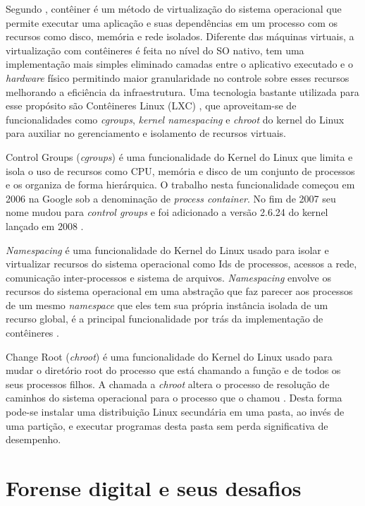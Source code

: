 Segundo \cite{AmazonContainer}, contêiner é um método de virtualização do sistema operacional que permite executar uma aplicação e suas dependências em um processo com os recursos como disco, memória e rede isolados.
%
Diferente das máquinas virtuais, a virtualização com contêineres é feita no nível do SO nativo, tem uma implementação mais simples eliminado camadas entre o aplicativo executado e o \textit{hardware} físico permitindo maior granularidade no controle sobre esses recursos melhorando a eficiência da infraestrutura.
%
Uma tecnologia bastante utilizada para esse propósito são Contêineres Linux (LXC) \cite{Linuxcontainers.org2015}, que aproveitam-se de funcionalidades como \textit{cgroups}, \textit{kernel namespacing} e \textit{chroot} do kernel do Linux para auxiliar no gerenciamento e isolamento de recursos virtuais.

Control Groups (\textit{cgroups}) é uma funcionalidade do Kernel do Linux que limita e isola o uso de recursos como CPU, memória e disco de um conjunto de processos e os organiza de forma hierárquica. 
%
O trabalho nesta funcionalidade começou em 2006 na Google sob a denominação de \textit{process container}. No fim de 2007 seu nome mudou para \textit{control groups} e foi adicionado a versão 2.6.24 do kernel lançado em 2008 \cite{UnixManPagesControlGroups}.

\textit{Namespacing} é uma funcionalidade do Kernel do Linux usado para isolar e virtualizar recursos do sistema operacional como Ids de processos, acessos a rede, comunicação inter-processos e sistema de arquivos.
%
\textit{Namespacing} envolve os recursos do sistema operacional em uma abstração que faz parecer aos processos de um mesmo \textit{namespace} que eles tem sua própria instância isolada de um recurso global, é a principal funcionalidade por trás da implementação de contêineres \cite{UnixManPagesNamespacing}.

Change Root (\textit{chroot}) é uma funcionalidade do Kernel do Linux usado para mudar o diretório root do processo que está chamando a função e de todos os seus processos filhos. 
%
A chamada a \textit{chroot} altera o processo de resolução de caminhos do sistema operacional para o processo que o chamou \cite{UnixManPagesChRoot}.
%
Desta forma pode-se instalar uma distribuição Linux secundária em uma pasta, ao invés de uma partição, e executar programas desta pasta sem perda significativa de desempenho.

\section{Forense digital e seus desafios}
\label{sec:forensedigital}

